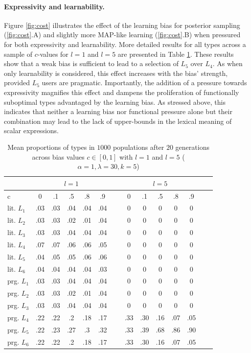 \documentclass[a4paper]{article}
\begin{document}
\paragraph{Expressivity and learnability.} Figure \ref{fig:cost} illustrates the effect of the learning bias for posterior sampling (\ref{fig:cost}.A) and slightly more MAP-like learning (\ref{fig:cost}.B) when pressured for both expressivity and learnability. More detailed results for all types across a sample of $c$-values for $l = 1$ and $l = 5$ are presented in Table \ref{tab:numeric-results}. These results show that a weak bias is sufficient to lead to a selection of $L_5$ over $L_4$. As when only learnability is considered, this effect increases with the bias' strength, provided $L_5$ users are pragmatic. Importantly, the addition of a pressure towards expressivity magnifies this effect and dampens the proliferation of functionally suboptimal types advantaged by the learning bias. As stressed above, this indicates that neither a learning bias nor functional pressure alone but their combination may lead to the lack of upper-bounds in the lexical meaning of scalar expressions.


\begin{table}
\centering 
\begin{tabular}{l | c c c c c| c c c c c c c c}
\multicolumn{1}{c}{~} & \multicolumn{5}{c}{$l = 1$} & ~ & \multicolumn{5}{c}{$l = 5$}\\ \hline \hline
  c        &  0  & .1  & .5  & .8  & .9 & ~ & 0 & .1 & .5 & .8 & .9\\ \hline \hline
lit. $L_1$ & .03 & .03 & .04 & .04 & .04& ~ & 0 &0 & 0 & 0 & 0\\ 
lit. $L_2$ & .03 & .03 & .02 & .01 & .04& ~ & 0& 0 & 0 & 0 & 0\\
lit. $L_3$ & .03 & .03 & .04 & .04 & .04& ~ & 0& 0 & 0 & 0 & 0\\
lit. $L_4$ & .07 & .07 & .06 & .06 & .05& ~ & 0& 0 & 0 & 0 & 0\\
lit. $L_5$ & .04 & .05 & .05 & .06 & .06& ~ & 0& 0 & 0 & 0 & 0\\
lit. $L_6$ & .04 & .04 & .04 & .04 & .03& ~ & 0& 0 & 0 & 0 & 0\\ \hline
prg. $L_1$ & .03 & .03 & .04 & .04 & .04& ~ & 0& 0 & 0 & 0 & 0 \\
prg. $L_2$ & .03 & .03 & .02 & .01 & .04& ~ & 0& 0 & 0 & 0 & 0 \\
prg. $L_3$ & .03 & .03 & .04 & .04 & .04& ~ & 0& 0 & 0 & 0 & 0 \\ 
prg. $L_4$ & .22 & .22 & .2 & .18 & .17& ~ & .33& .30 & .16 & .07 & .05 \\
prg. $L_5$ & .22 & .23 & .27 & .3  & .32& ~ & .33& .39 & .68 & .86 & .90 \\
prg. $L_6$ & .22 & .22 & .2 & .18 & .17& ~ & .33& .30 & .16 & .07 & .05
\end{tabular}
\caption{Mean proportions of types in $1000$ populations after $20$ generations across bias values $c \in [0,1]$ with $l =1$ and $l = 5$ ($\alpha = 1, \lambda = 30, k = 5$)}%
\label{tab:numeric-results}
\end{table}
\end{document}
